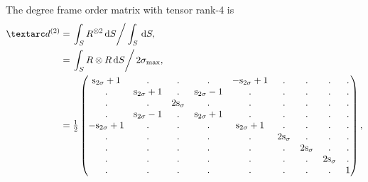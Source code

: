 The  degree frame order matrix with tensor rank-4 is
\begin{subequations}
\begin{align}
    \FOtwo &= \left. \int_S R^{\otimes 2} \diff S \right / \int_S \diff S, \\
           &= \left. \int_S R \otimes R \diff S \right / 2\conesmax, \\
           &= \half \begin{pmatrix}
    \sinctwosigma+1  & .               & .           & .               & -\sinctwosigma+1 & .           & .           & .           & . \\
    .                & \sinctwosigma+1 & .           & \sinctwosigma-1 & .                & .           & .           & .           & . \\
    .                & .               & 2\sincsigma & .               & .                & .           & .           & .           & . \\
    .                & \sinctwosigma-1 & .           & \sinctwosigma+1 & .                & .           & .           & .           & . \\
    -\sinctwosigma+1 & .               & .           & .               & \sinctwosigma+1  & .           & .           & .           & . \\
    .                & .               & .           & .               & .                & 2\sincsigma & .           & .           & . \\
    .                & .               & .           & .               & .                & .           & 2\sincsigma & .           & . \\
    .                & .               & .           & .               & .                & .           & .           & 2\sincsigma & . \\
    .                & .               & .           & .               & .                & .           & .           & .           & 1 \\
              \end{pmatrix} ,
\end{align}
\end{subequations}

